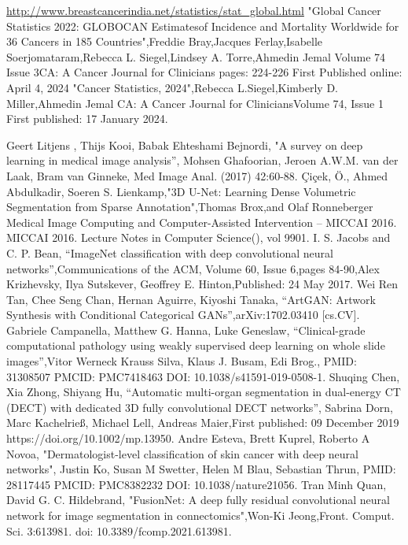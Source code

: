 \documentclass[conference]{IEEEtran}
\begin{document}
\begin{thebibliography}{00}
 \url{ http://www.breastcancerindia.net/statistics/stat_global.html}
"Global Cancer Statistics 2022: GLOBOCAN Estimatesof Incidence and Mortality Worldwide for 36 Cancers in 185 Countries",Freddie Bray,Jacques Ferlay,Isabelle Soerjomataram,Rebecca L. Siegel,Lindsey A. Torre,Ahmedin Jemal  Volume 74 Issue 3CA: A Cancer Journal for Clinicians pages: 224-226 First Published online: April 4, 2024
"Cancer Statistics, 2024",Rebecca L.Siegel,Kimberly D. Miller,Ahmedin Jemal CA: A Cancer Journal for CliniciansVolume 74, Issue 1 First published: 17 January 2024.

Geert Litjens , Thijs Kooi, Babak Ehteshami Bejnordi, "A survey on deep learning in medical image analysis'', Mohsen Ghafoorian, Jeroen A.W.M. van der Laak, Bram van Ginneke, Med Image Anal. (2017) 42:60-88.
Çiçek, Ö., Ahmed Abdulkadir, Soeren S. Lienkamp,"3D U-Net: Learning Dense Volumetric Segmentation from Sparse Annotation",Thomas Brox,and Olaf Ronneberger Medical Image Computing and Computer-Assisted Intervention – MICCAI 2016. MICCAI 2016. Lecture Notes in Computer Science(), vol 9901. 
 I. S. Jacobs and C. P. Bean, ``ImageNet classification with deep convolutional neural networks'',Communications of the ACM, Volume 60, Issue 6,pages 84-90,Alex Krizhevsky, Ilya Sutskever, Geoffrey E. Hinton,Published: 24 May 2017.
Wei Ren Tan, Chee Seng Chan, Hernan Aguirre, Kiyoshi Tanaka, ``ArtGAN: Artwork Synthesis with Conditional Categorical GANs'',arXiv:1702.03410 [cs.CV].
 Gabriele Campanella, Matthew G. Hanna, Luke Geneslaw, ``Clinical-grade computational pathology using weakly supervised deep learning on whole slide images'',Vitor Werneck Krauss Silva, Klaus J. Busam, Edi Brog., PMID: 31308507 PMCID: PMC7418463 DOI: 10.1038/s41591-019-0508-1.
 Shuqing Chen, Xia Zhong, Shiyang Hu, ``Automatic multi-organ segmentation in dual-energy CT (DECT) with dedicated 3D fully convolutional DECT networks'', Sabrina Dorn, Marc Kachelrieß, Michael Lell, Andreas Maier,First published: 09 December 2019 https://doi.org/10.1002/mp.13950.
Andre Esteva, Brett Kuprel, Roberto A Novoa, "Dermatologist-level classification of skin cancer with deep neural networks", Justin Ko, Susan M Swetter, Helen M Blau, Sebastian Thrun, PMID: 28117445 PMCID: PMC8382232 DOI: 10.1038/nature21056.
Tran Minh Quan, David G. C. Hildebrand, "FusionNet: A deep fully residual convolutional neural network 
for image segmentation in connectomics",Won-Ki Jeong,Front. Comput. Sci. 3:613981. doi: 10.3389/fcomp.2021.613981.

\end{thebibliography}
\end{document}
